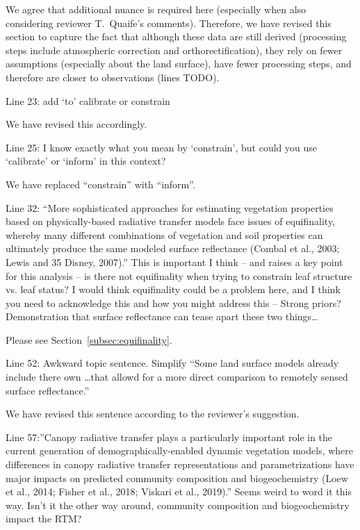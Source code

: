 We agree that additional nuance is required here (especially when also considering reviewer T.\ Quaife’s comments).
Therefore, we have revised this section to capture the fact that although these data are still derived (processing steps include atmospheric correction and orthorectification), they rely on fewer assumptions (especially about the land surface), have fewer processing steps, and therefore are closer to observations (lines TODO).

\begin{reviewer}
  Line 23: add ‘to’ calibrate or constrain
\end{reviewer}

We have revised this accordingly.

\begin{reviewer}
  Line 25: I know exactly what you mean by ‘constrain’, but could you use ‘calibrate’ or ‘inform’ in this context?
\end{reviewer}

We have replaced ``constrain'' with ``inform''.

\begin{reviewer}
  Line 32: “More sophisticated approaches for estimating vegetation properties based on physically-based radiative transfer models face issues of equifinality, whereby many different combinations of vegetation and soil properties can ultimately produce the same modeled surface reflectance (Combal et al., 2003; Lewis and 35 Disney, 2007).”
  This is important I think – and raises a key point for this analysis – is there not equifinality when trying to constrain leaf structure vs. leaf status? I would think equifinality could be a problem here, and I think you need to acknowledge this and how you might address this – Strong priors? Demonstration that surface reflectance can tease apart these two things\ldots
\end{reviewer}

Please see Section~\ref{subsec:equifinality}.

\begin{reviewer}
  Line 52: Awkward topic sentence. Simplify “Some land surface models already include there own \ldots that allowd for a more direct comparison to remotely sensed surface reflectance.”
\end{reviewer}

We have revised this sentence according to the reviewer’s suggestion.

\begin{reviewer}
Line 57:”Canopy radiative transfer plays a particularly important role in the current generation of demographically-enabled dynamic vegetation models, where differences in canopy radiative transfer representations and parametrizations have major impacts on predicted community composition and biogeochemistry (Loew et al., 2014; Fisher et al., 2018; Viskari et al., 2019).” Seems weird to word it this way. Isn’t it the other way around, community composition and biogeochemistry impact the RTM?
\end{reviewer}

